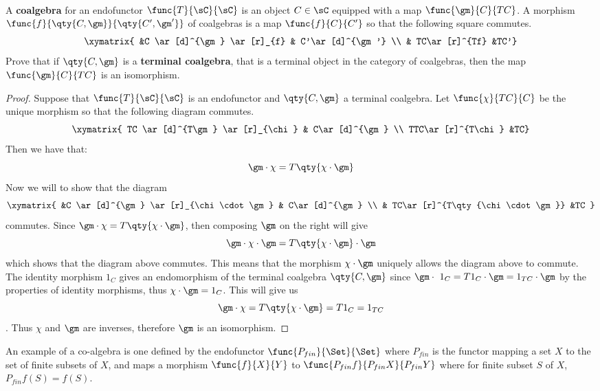 \documentclass[main.tex]{subfiles}
\begin{document}
\paragraph{}
\begin{exercise}
	A {\bf coalgebra} for an endofunctor $\func{T}{\sC}{\sC}$ is an object $C
	\in \sC$ equipped with a map $\func{\gm}{C}{TC}$. A morphism
	$\func{f}{\qty{C,\gm}}{\qty{C',\gm'}}$ of coalgebras is a map
	$\func{f}{C}{C'}$ so that the following square commutes.
	\[\xymatrix{ &C \ar[d]^{\gm} \ar[r]_{f} & C'\ar[d]^{\gm'}  \\  &
	TC\ar[r]^{Tf} &TC'}\]
	Prove that if $\qty{C,\gm}$ is a {\bf terminal coalgebra}, that is
	a terminal object in the category of coalgebras, then the map
	$\func{\gm}{C}{TC}$ is an isomorphism.
\end{exercise}
\begin{proof}
	Suppose that $\func{T}{\sC}{\sC}$ is an endofunctor and $\qty{C,\gm}$ a
	terminal coalgebra. Let $\func{\chi}{TC}{C}$ be the unique morphism so that
	the following diagram commutes.
	\[\xymatrix{ TC \ar[d]^{T\gm} \ar[r]_{\chi} & C\ar[d]^{\gm} \\
	TTC\ar[r]^{T\chi} &TC}\]
	Then we
	have that: $$ \gm \cdot \chi = T\qty{\chi \cdot \gm}    $$ Now we will
	to show that the diagram $$\xymatrix{ &C \ar[d]^{\gm} \ar[r]_{\chi \cdot
	\gm} & C\ar[d]^{\gm}  \\  & TC\ar[r]^{T\qty{\chi \cdot \gm}} &TC   } $$
	commutes. Since $ \gm \cdot \chi = T\qty{\chi \cdot \gm}    $, then
	composing $\gm$ on the right will give $$ \gm \cdot \chi \cdot \gm =
	T\qty{\chi \cdot \gm} \cdot \gm   $$ which shows that the diagram above
	commutes. This means that the morphism $\chi \cdot \gm$ uniquely allows
	the diagram above to commute. The identity morphism $1_C$ gives an
	endomorphism of the terminal coalgebra $\qty{C,\gm}$ since $\gm \cdot \
	1_{C} = T1_{C} \cdot \gm = 1_{TC} \cdot \gm$ by the properties of
	identity morphisms, thus $\chi \cdot \gm = 1_{C}$. This will give us
	$$\gm \cdot \chi = T\qty{\chi \cdot \gm}  = T1_{C} = 1_{TC} $$. Thus
	$\chi$ and $\gm$ are inverses, therefore $\gm$ is an isomorphism.
\end{proof}

An example of a co-algebra is one defined by the endofunctor
$\func{P_{fin}}{\Set}{\Set}$ where $P_{fin}$ is the functor mapping a set $X$ to
the set of finite subsets of $X$, and maps a morphism $\func{f}{X}{Y}$ to
$\func{P_{fin}f}{P_{fin}X}{P_{fin}Y}$ where for finite subset $S$ of $X$,
$P_{fin}f(S) = f(S)$.
\end{document}

